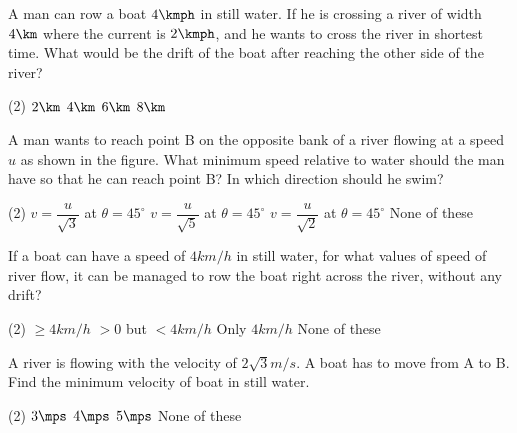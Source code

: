 \item A man can row a boat $4 \kmph$ in still water. If he is crossing a river of width $4\km$ where the current is $2 \kmph$, and he wants to cross the river in shortest time. What would be the drift of the boat after reaching the other side of the river?
\begin{tasks}(2)
    \task $2\km$\ans
    \task $4\km$
    \task $6\km$
    \task $8\km$
\end{tasks}

\item A man wants to reach point B on the opposite bank of a river flowing at a speed $u$ as shown in the figure. What minimum speed relative to water should the man have so that he can reach point B? In which direction should he swim?
\begin{center}
\end{center}
\begin{tasks}(2)
    \task $v=\dfrac{u}{\sqrt{3}}$ at $\theta=45^\circ$
    \task $v=\dfrac{u}{\sqrt{5}}$ at $\theta=45^\circ$
    \task $v=\dfrac{u}{\sqrt{2}}$ at $\theta=45^\circ$\ans
    \task None of these
\end{tasks}

\item If a boat can have a speed of $4 km/h$ in still water, for what values of speed of river flow, it can be managed to row the boat right across the river, without any drift?
\begin{tasks}(2)
\task $\geq 4 km/h$
\task $> 0$ but $< 4 km/h$
\task Only $4 km/h$
\task None of these\ans
\end{tasks}


\item A river is flowing with the velocity of $2\sqrt{3} m/s$. A boat has to move from A to B. Find the minimum velocity of boat in still water.
\begin{center}
\end{center}
\begin{tasks}(2)
    \task $3\mps$\ans
    \task $4\mps$
    \task $5\mps$
    \task None of these
\end{tasks}

